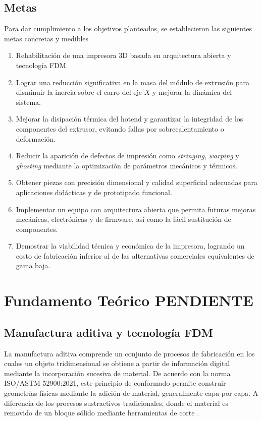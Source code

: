 \subsection{Metas}
Para dar cumplimiento a los objetivos planteados, se establecieron las 
siguientes metas concretas y medibles

\begin{enumerate}

\item Rehabilitación de una impresora 3D  basada en arquitectura abierta y tecnología FDM.

\item Lograr una reducción significativa en la masa del módulo de extrusión 
para disminuir la inercia sobre el carro del eje \(X\) y mejorar la dinámica 
del sistema.

\item Mejorar la disipación térmica del hotend y garantizar la integridad de 
los componentes del extrusor, evitando fallas por sobrecalentamiento o 
deformación.

\item Reducir la aparición de defectos de impresión como \textit{stringing}, \textit{warping} y \textit{ghosting} mediante la optimización de parámetros mecánicos y térmicos.

\item Obtener piezas con precisión dimensional y calidad superficial adecuadas para aplicaciones didácticas y de prototipado funcional.

\item Implementar un equipo con arquitectura abierta que permita futuras 
mejoras mecánicas, electrónicas y de firmware, así como la fácil sustitución 
de componentes.

\item Demostrar la viabilidad técnica y económica de la impresora, logrando 
un costo de fabricación inferior al de las alternativas comerciales 
equivalentes de gama baja.


\end{enumerate}

\section{Fundamento Teórico PENDIENTE}

\subsection{Manufactura aditiva y tecnología FDM}
La manufactura aditiva comprende un conjunto de procesos de fabricación en los cuales un objeto tridimensional se obtiene a partir de información digital mediante la incorporación sucesiva de material. De acuerdo con la norma ISO/ASTM 52900:2021, este principio de conformado permite construir geometrías físicas mediante la adición de material, generalmente capa por capa. A diferencia de los procesos sustractivos tradicionales, donde el material es removido de un bloque sólido mediante herramientas de corte \cite{iso_52900_2021}.

